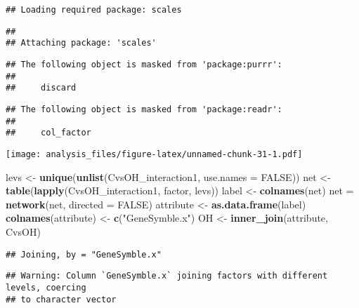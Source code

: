 \documentclass[]{article}
\newenvironment{Shaded}{\begin{snugshade}}{\end{snugshade}}
\newcommand{\DataTypeTok}[1]{\textcolor[rgb]{0.13,0.29,0.53}{#1}}
\newcommand{\KeywordTok}[1]{\textcolor[rgb]{0.13,0.29,0.53}{\textbf{#1}}}
\newcommand{\NormalTok}[1]{#1}
\newcommand{\OtherTok}[1]{\textcolor[rgb]{0.56,0.35,0.01}{#1}}
\newcommand{\StringTok}[1]{\textcolor[rgb]{0.31,0.60,0.02}{#1}}
\begin{document}
\begin{verbatim}
## Loading required package: scales
\end{verbatim}

\begin{verbatim}
## 
## Attaching package: 'scales'
\end{verbatim}

\begin{verbatim}
## The following object is masked from 'package:purrr':
## 
##     discard
\end{verbatim}

\begin{verbatim}
## The following object is masked from 'package:readr':
## 
##     col_factor
\end{verbatim}

\texttt{[image: analysis\_files/figure-latex/unnamed-chunk-31-1.pdf]}

\begin{Shaded}
\begin{Highlighting}[]
\NormalTok{levs <-}\StringTok{ }\KeywordTok{unique}\NormalTok{(}\KeywordTok{unlist}\NormalTok{(CvsOH_interaction1, }\DataTypeTok{use.names =} \OtherTok{FALSE}\NormalTok{))}
\NormalTok{net <-}\StringTok{ }\KeywordTok{table}\NormalTok{(}\KeywordTok{lapply}\NormalTok{(CvsOH_interaction1, factor, levs))}
\NormalTok{label <-}\StringTok{ }\KeywordTok{colnames}\NormalTok{(net)}
\NormalTok{net =}\StringTok{ }\KeywordTok{network}\NormalTok{(net, }\DataTypeTok{directed =} \OtherTok{FALSE}\NormalTok{)}
\NormalTok{attribute <-}\StringTok{ }\KeywordTok{as.data.frame}\NormalTok{(label)}
\KeywordTok{colnames}\NormalTok{(attribute) <-}\StringTok{ }\KeywordTok{c}\NormalTok{(}\StringTok{"GeneSymble.x"}\NormalTok{)}
\NormalTok{OH <-}\StringTok{ }\KeywordTok{inner_join}\NormalTok{(attribute, CvsOH)}
\end{Highlighting}
\end{Shaded}

\begin{verbatim}
## Joining, by = "GeneSymble.x"
\end{verbatim}

\begin{verbatim}
## Warning: Column `GeneSymble.x` joining factors with different levels, coercing
## to character vector
\end{verbatim}
\end{document}
